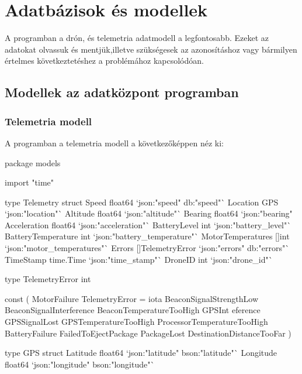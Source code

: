 

\section{Adatbázisok és modellek}
A programban a drón, és telemetria adatmodell a legfontosabb.
Ezeket az adatokat olvassuk és mentjük,illetve szükségesek az azonosításhoz vagy bármilyen értelmes következtetéshez a problémához kapcsolódóan.

\subsection{Modellek az adatközpont programban}
\subsubsection{Telemetria modell}
A programban a telemetria modell a következőképpen néz ki:

\begin{python}
    package models

    import "time"

    type Telemetry struct {
        Speed              float64          `json:"speed" db:"speed"`
        Location           GPS              `json:"location"`
        Altitude           float64          `json:"altitude"`
        Bearing            float64          `json:"bearing"
        Acceleration       float64          `json:"acceleration"`
        BatteryLevel       int              `json:"battery_level"`
        BatteryTemperature int              `json:"battery_temperature"`
        MotorTemperatures  []int            `json:"motor_temperatures"`
        Errors             []TelemetryError `json:"errors" db:"errors"`
        TimeStamp          time.Time        `json:"time_stamp"`
        DroneID            int              `json:"drone_id"`
    }

    type TelemetryError int

    const (
        MotorFailure TelemetryError = iota
        BeaconSignalStrengthLow
        BeaconSignalInterference
        BeaconTemperatureTooHigh
        GPSInt	eference
        GPSSignalLost
        GPSTemperatureTooHigh
        ProcessorTemperatureTooHigh
        BatteryFailure
        FailedToEjectPackage
        PackageLost
        DestinationDistanceTooFar
    )

    type GPS struct {
        Latitude  float64 `json:"latitude" bson:"latitude"`
        Longitude float64 `json:"longitude" bson:"longitude"`
    }

\end{python}


